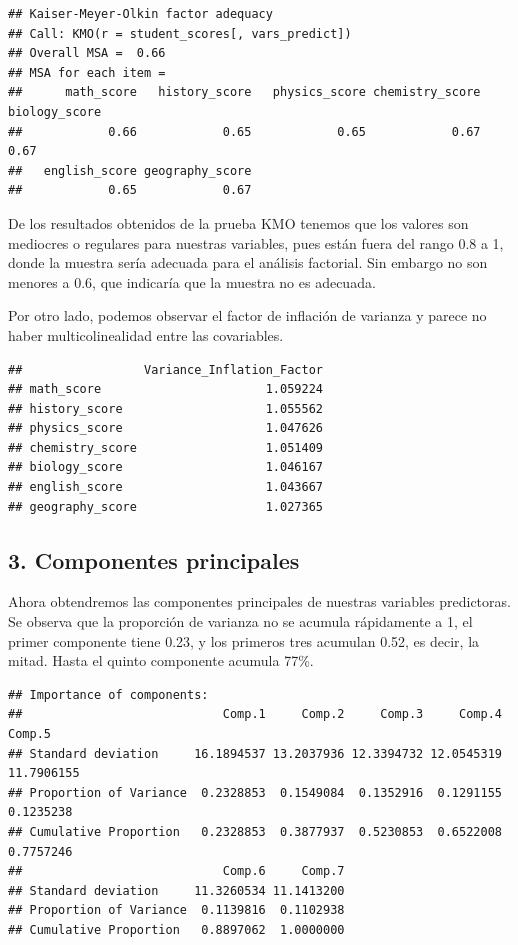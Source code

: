 \documentclass[
]{article}
\begin{document}
\begin{verbatim}
## Kaiser-Meyer-Olkin factor adequacy
## Call: KMO(r = student_scores[, vars_predict])
## Overall MSA =  0.66
## MSA for each item = 
##      math_score   history_score   physics_score chemistry_score   biology_score 
##            0.66            0.65            0.65            0.67            0.67 
##   english_score geography_score 
##            0.65            0.67
\end{verbatim}

De los resultados obtenidos de la prueba KMO tenemos que los valores son
mediocres o regulares para nuestras variables, pues están fuera del
rango 0.8 a 1, donde la muestra sería adecuada para el análisis
factorial. Sin embargo no son menores a 0.6, que indicaría que la
muestra no es adecuada.

Por otro lado, podemos observar el factor de inflación de varianza y
parece no haber multicolinealidad entre las covariables.

\begin{verbatim}
##                 Variance_Inflation_Factor
## math_score                       1.059224
## history_score                    1.055562
## physics_score                    1.047626
## chemistry_score                  1.051409
## biology_score                    1.046167
## english_score                    1.043667
## geography_score                  1.027365
\end{verbatim}

\hypertarget{componentes-principales}{%
\subsection{3. Componentes principales}\label{componentes-principales}}

Ahora obtendremos las componentes principales de nuestras variables
predictoras. Se observa que la proporción de varianza no se acumula
rápidamente a 1, el primer componente tiene 0.23, y los primeros tres
acumulan 0.52, es decir, la mitad. Hasta el quinto componente acumula
77\%.

\begin{verbatim}
## Importance of components:
##                            Comp.1     Comp.2     Comp.3     Comp.4     Comp.5
## Standard deviation     16.1894537 13.2037936 12.3394732 12.0545319 11.7906155
## Proportion of Variance  0.2328853  0.1549084  0.1352916  0.1291155  0.1235238
## Cumulative Proportion   0.2328853  0.3877937  0.5230853  0.6522008  0.7757246
##                            Comp.6     Comp.7
## Standard deviation     11.3260534 11.1413200
## Proportion of Variance  0.1139816  0.1102938
## Cumulative Proportion   0.8897062  1.0000000
\end{verbatim}
\end{document}
